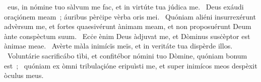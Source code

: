 \psalmChapterWithInscription{}
{  }
{%
~eus, in nómine tuo sàlvum me fac, et in virtúte tua júdica me. 
~Deus exáudi oraçiónem meam~; áuribus pèrċipe vèrba oris mei. 
~Quóniam aliéni insurrexérunt advèrsum me, et fortes quaesivérunt ànimam meam, et non proposuérunt Deum ànte conspèctum suum. 
~Ecċe ènim Deus àdjuvat me, et Dòminus susċèptor est ànimae meae. 
~Avèrte màla inimícïs meïs, et in veritáte tua dispèrde illos. 
~Voluntárie sacrificábo tìbi, et confitébor nómini tuo Dòmine, quóniam bonum est~; 
~quóniam ex òmni tribulaçióne eripuìsti me, et super inimícos meos despèxit òculus meus. 
}
